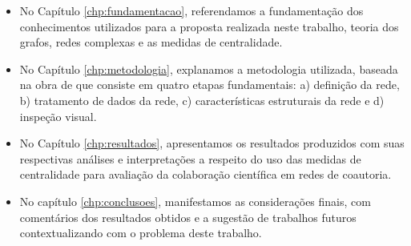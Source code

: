 \begin{itemize}

\item No Capítulo \ref{chp:fundamentacao}, referendamos a fundamentação dos conhecimentos utilizados para a proposta realizada neste trabalho, teoria dos grafos, redes complexas e as medidas de centralidade. 

\item No Capítulo \ref{chp:metodologia}, explanamos a metodologia utilizada, baseada na obra de \citep{de2018exploratory} que consiste em quatro etapas fundamentais: a) definição da rede, b) tratamento de dados da rede, c) características estruturais da rede e d) inspeção visual. 

\item No Capítulo \ref{chp:resultados}, apresentamos os resultados produzidos com suas respectivas análises e interpretações a respeito do uso das medidas de centralidade para avaliação da colaboração científica em redes de coautoria. 

\item No capítulo \ref{chp:conclusoes}, manifestamos as considerações finais, com comentários dos resultados obtidos e a sugestão de trabalhos futuros contextualizando com o problema deste trabalho. 
\end{itemize}



